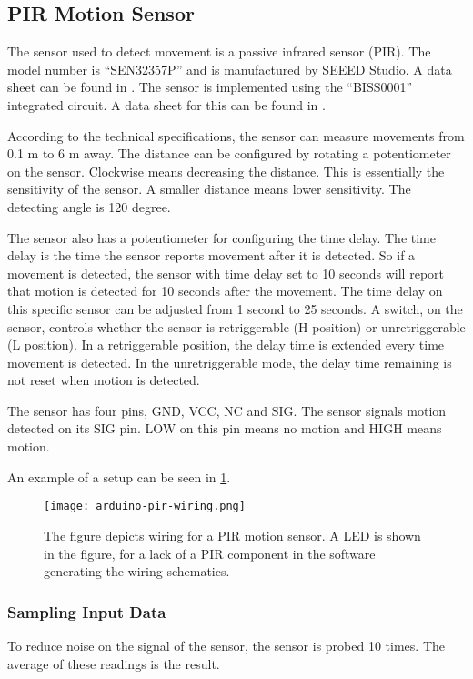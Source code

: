 \subsection{PIR Motion Sensor}\label{sub:pir}

The sensor used to detect movement is a passive infrared sensor (PIR). The model
number is \enquote{SEN32357P} and is manufactured by SEEED Studio. A data sheet
can be found in
\cite{datasheet_pir1}. The
sensor is implemented using the \enquote{BISS0001} integrated circuit. A data sheet for this can
be found in \cite{datasheet_pir2}.

According to the technical specifications, the sensor can measure movements from 0.1 m to 6 m away. The distance can be configured by rotating a potentiometer on the sensor. Clockwise means decreasing the distance. This is essentially the sensitivity of the sensor. A smaller distance means lower sensitivity. The detecting angle is 120 degree.

The sensor also has a potentiometer for configuring the time delay. The time
delay is the time the sensor reports movement after it is detected. So
if a movement is detected, the sensor with time delay set to 10 seconds will report that motion is detected for 10 seconds after the movement.
The time delay on this specific sensor can be adjusted from 1 second to 25 seconds. A switch, on the sensor, controls whether the sensor is retriggerable (H position) or unretriggerable (L position). In a retriggerable position, the delay time is extended every time movement is detected. In the unretriggerable mode, the delay time remaining is not reset when motion is detected.

The sensor has four pins, GND, VCC, NC and SIG. The sensor signals motion detected on its SIG pin. LOW on this pin means no motion and HIGH means motion.

An example of a setup can be seen in \cref{fig:arduino_pir_wiring}.

\begin{figure}[htbp]
  \centering
  \texttt{[image: arduino-pir-wiring.png]}
  \caption[PIR sensor]{The figure depicts wiring for a PIR motion sensor. A LED is shown in
    the figure, for a lack of a PIR component in the software generating the
    wiring schematics.}
  \label{fig:arduino_pir_wiring}
\end{figure}

\subsubsection{Sampling Input Data}
To reduce noise on the signal of the sensor, the sensor is probed 10 times. The average of these readings is the result.
